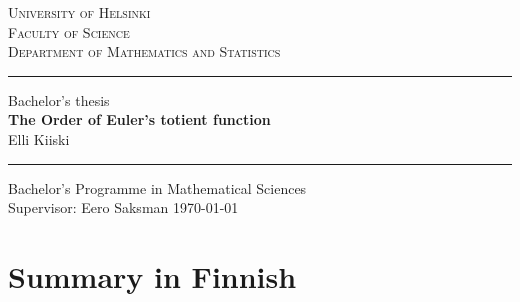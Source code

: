\documentclass{article}
\begin{document}
\begin{titlepage}
\setlength{\parindent}{0mm}
\Large
\textsc{University of Helsinki \\
Faculty of Science\\
Department of Mathematics and Statistics}
\vspace{5mm}
\hrule height2pt

\begin{center}
\vfill
\Large Bachelor's thesis  \\
\vspace{3mm}
\huge 
\textbf{The Order of Euler's totient function}\\
\vspace{3mm}
\Large Elli Kiiski
\vfill
\end{center}

\hrule height2pt
\vspace{5mm}
Bachelor's Programme in Mathematical Sciences \\[2mm]
Supervisor: Eero Saksman
\hfill
\today
\end{titlepage}

\tableofcontents
\thispagestyle{empty}
\clearpage

\thispagestyle{empty}
\section*{Summary in Finnish}
\end{document}
